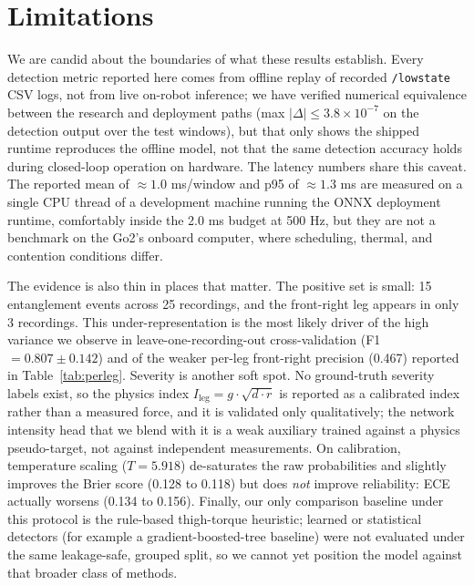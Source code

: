 \section{Limitations}

We are candid about the boundaries of what these results establish. Every detection metric reported here comes from offline replay of recorded \texttt{/lowstate} CSV logs, not from live on-robot inference; we have verified numerical equivalence between the research and deployment paths (max $|\Delta| \le 3.8\times10^{-7}$ on the detection output over the test windows), but that only shows the shipped runtime reproduces the offline model, not that the same detection accuracy holds during closed-loop operation on hardware. The latency numbers share this caveat. The reported mean of $\approx 1.0$ ms/window and p95 of $\approx 1.3$ ms are measured on a single CPU thread of a development machine running the ONNX deployment runtime, comfortably inside the 2.0 ms budget at 500 Hz, but they are not a benchmark on the Go2's onboard computer, where scheduling, thermal, and contention conditions differ.

The evidence is also thin in places that matter. The positive set is small: 15 entanglement events across 25 recordings, and the front-right leg appears in only 3 recordings. This under-representation is the most likely driver of the high variance we observe in leave-one-recording-out cross-validation (F1 $= 0.807 \pm 0.142$) and of the weaker per-leg front-right precision (0.467) reported in Table~\ref{tab:perleg}. Severity is another soft spot. No ground-truth severity labels exist, so the physics index $I_{\text{leg}} = g\cdot\sqrt{d\cdot r}$ is reported as a calibrated index rather than a measured force, and it is validated only qualitatively; the network intensity head that we blend with it is a weak auxiliary trained against a physics pseudo-target, not against independent measurements. On calibration, temperature scaling ($T = 5.918$) de-saturates the raw probabilities and slightly improves the Brier score (0.128 to 0.118) but does \emph{not} improve reliability: ECE actually worsens (0.134 to 0.156). Finally, our only comparison baseline under this protocol is the rule-based thigh-torque heuristic; learned or statistical detectors (for example a gradient-boosted-tree baseline) were not evaluated under the same leakage-safe, grouped split, so we cannot yet position the model against that broader class of methods.